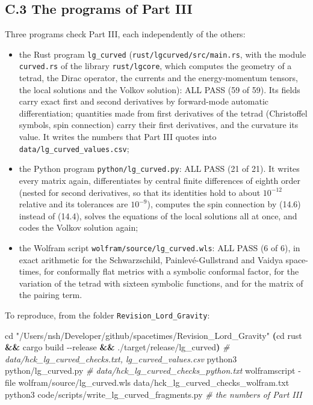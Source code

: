 \documentclass[
  10pt,
]{article}
\newenvironment{Shaded}{}{}
\newcommand{\AttributeTok}[1]{\textcolor[rgb]{0.49,0.56,0.16}{#1}}
\newcommand{\BuiltInTok}[1]{\textcolor[rgb]{0.00,0.50,0.00}{#1}}
\newcommand{\CommentTok}[1]{\textcolor[rgb]{0.38,0.63,0.69}{\textit{#1}}}
\newcommand{\ExtensionTok}[1]{#1}
\newcommand{\KeywordTok}[1]{\textcolor[rgb]{0.00,0.44,0.13}{\textbf{#1}}}
\newcommand{\NormalTok}[1]{#1}
\newcommand{\StringTok}[1]{\textcolor[rgb]{0.25,0.44,0.63}{#1}}
\providecommand{\tightlist}{%
  \setlength{\itemsep}{0pt}\setlength{\parskip}{0pt}}
\begin{document}
\hypertarget{c.3-the-programs-of-part-iii}{%
\subsection{C.3 The programs of Part
III}\label{c.3-the-programs-of-part-iii}}

Three programs check Part III, each independently of the others:

\begin{itemize}
\tightlist
\item
  the Rust program \texttt{lg\_curved}
  (\texttt{rust/lgcurved/src/main.rs}, with the module
  \texttt{curved.rs} of the library \texttt{rust/lgcore}, which computes
  the geometry of a tetrad, the Dirac operator, the currents and the
  energy-momentum tensors, the local solutions and the Volkov solution):
  ALL PASS (59 of 59). Its fields carry exact first and second
  derivatives by forward-mode automatic differentiation; quantities made
  from first derivatives of the tetrad (Christoffel symbols, spin
  connection) carry their first derivatives, and the curvature its
  value. It writes the numbers that Part III quotes into
  \texttt{data/lg\_curved\_values.csv};
\item
  the Python program \texttt{python/lg\_curved.py}: ALL PASS (21 of 21).
  It writes every matrix again, differentiates by central finite
  differences of eighth order (nested for second derivatives, so that
  its identities hold to about \(10^{-12}\) relative and its tolerances
  are \(10^{-9}\)), computes the spin connection by (14.6) instead of
  (14.4), solves the equations of the local solutions all at once, and
  codes the Volkov solution again;
\item
  the Wolfram script \texttt{wolfram/source/lg\_curved.wls}: ALL PASS (6
  of 6), in exact arithmetic for the Schwarzschild, Painlevé-Gullstrand
  and Vaidya space-times, for conformally flat metrics with a symbolic
  conformal factor, for the variation of the tetrad with sixteen
  symbolic functions, and for the matrix of the pairing term.
\end{itemize}

To reproduce, from the folder \texttt{Revision\_Lord\_Gravity}:

\begin{Shaded}
\begin{Highlighting}[]
\BuiltInTok{cd} \StringTok{"/Users/nsh/Developer/github/spacetimes/Revision\_Lord\_Gravity"}
\KeywordTok{(}\BuiltInTok{cd}\NormalTok{ rust }\KeywordTok{\&\&} \ExtensionTok{cargo}\NormalTok{ build }\AttributeTok{{-}{-}release} \KeywordTok{\&\&} \ExtensionTok{./target/release/lg\_curved}\KeywordTok{)} \CommentTok{\# data/hck\_lg\_curved\_checks.txt, lg\_curved\_values.csv}
\ExtensionTok{python3}\NormalTok{ python/lg\_curved.py                                       }\CommentTok{\# data/hck\_lg\_curved\_checks\_python.txt}
\ExtensionTok{wolframscript} \AttributeTok{{-}file}\NormalTok{ wolfram/source/lg\_curved.wls data/hck\_lg\_curved\_checks\_wolfram.txt}
\ExtensionTok{python3}\NormalTok{ code/scripts/write\_lg\_curved\_fragments.py                }\CommentTok{\# the numbers of Part III}
\end{Highlighting}
\end{Shaded}
\end{document}

